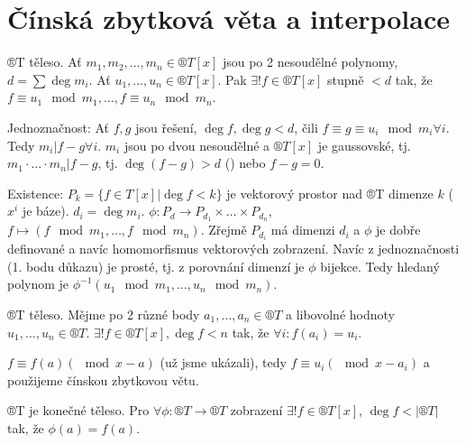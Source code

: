 \documentclass[12pt]{article}                   %
\begin{document}
\section{Čínská zbytková věta a interpolace}
    \begin{veta}
        ®T těleso. Ať $m_1, m_2, …, m_n \in ®T[x]$ jsou po 2 nesoudělné polynomy, $d = \sum \deg m_i$. Ať $u_1, …, u_n \in ®T[x]$. Pak $\exists! f \in ®T[x]$ stupně $<d$ tak, že $f ≡ u_1 \mod m_1, …, f ≡ u_n \mod m_n$.

        \begin{dukazin}
            Jednoznačnost: Ať $f, g$ jsou řešení, $\deg f, \deg g < d$, čili $f≡g≡u_i \mod m_i \forall i$. Tedy $m_i | f-g \forall i$. $m_i$ jsou po dvou nesoudělné a $®T[x]$ je gaussovské, tj. $m_1·…·m_n |f - g$, tj. $\deg(f-g) > d$ (\lightning) nebo $f-g = 0$.

            Existence: $P_k = \{f \in T[x]|\deg f < k\}$ je vektorový prostor nad ®T dimenze $k$ ($x^i$ je báze). $d_i = \deg m_i$. $\phi: P_d \rightarrow P_{d_1}\times … \times P_{d_n}$, $f \mapsto (f \mod m_1, …, f \mod m_n)$. Zřejmě $P_{d_i}$ má dimenzi $d_i$ a $\phi$ je dobře definované a navíc homomorfismus vektorových zobrazení. Navíc z jednoznačnosti (1. bodu důkazu) je prosté, tj. z porovnání dimenzí je $\phi$ bijekce. Tedy hledaný polynom je $\phi^{-1}(u_1 \mod m_1, …, u_n \mod m_n)$.
        \end{dukazin}
    \end{veta}


    \begin{dusledek}
        ®T těleso. Mějme po 2 různé body $a_1, …, a_n \in ®T$ a libovolné hodnoty $u_1, …, u_n \in ®T$. $\exists! f \in ®T[x], \deg f < n$ tak, že $\forall i: f(a_i) = u_i$.

        \begin{dukazin}
            $f ≡ f(a) (\mod x - a)$ (už jsme ukázali), tedy $f ≡ u_i (\mod x - a_i)$ a použijeme čínskou zbytkovou větu.
        \end{dukazin}
    \end{dusledek}

    \begin{dusledek}
        ®T je konečné těleso. Pro $\forall \phi: ®T \rightarrow ®T$ zobrazení $\exists! f \in ®T[x]$, $\deg f < |®T|$ tak, že $\phi(a) = f(a)$.
    \end{dusledek}
\end{document}
